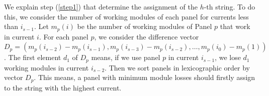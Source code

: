 \documentclass[conference]{IEEEtran}
\begin{document}
\newpage
We explain step (\ref{step1}) that determine the assignment of the $h$-th string. To do this, we consider the number of working modules of each panel for currents less than $i_{s-1}$. Let $m_p(i)$ be the number of working modules of Panel $p$ that work in current $i$. For each panel $p$, we consider the difference vector $D_p=(m_p(i_{s-2})-m_p(i_{s-1}), m_p(i_{s-3})-m_p(i_{s-2}), \ldots, m_p(i_0)-m_p(1))$. The first element $d_1$ of $D_p$ means, if we use panel $p$ in current $i_{s-1}$, we lose $d_1$ working modules in current $i_{s-2}$. Then we sort panels in lexicographic order by vector $D_p$. This means, a panel with minimum module losses should firstly assign to the string with the highest current.
\end{document}
